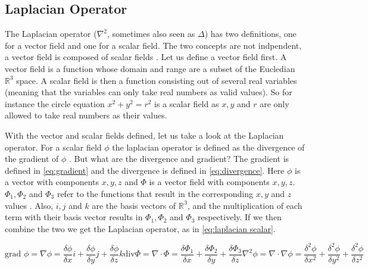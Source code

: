 \subsection{Laplacian Operator} \label{sec:laplace}
The Laplacian operator ($\nabla^2$, sometimes also seen as $\Delta$) has two definitions, one for a vector field and one for a scalar field. The two concepts are not indpendent, a vector field 
is composed of scalar fields \cite{vectorscalarfields}. Let us define a vector field first. A vector field is a function whose domain and range are a subset of the Eucledian $\mathbb{R}^3$ space. 
A scalar field is then a function consisting out of several real variables (meaning that the variables can only take real numbers as valid values). So for instance the circle equation 
$x^2 + y^2 = r^2$ is a scalar field as $x, y$ and $r$ are only allowed to take real numbers as their values. 

With the vector and scalar fields defined, let us take a look at the Laplacian operator. For a scalar field $\phi$ the laplacian operator is defined as the divergence of the gradient of $\phi$
\cite{laplacian}. But what are the divergence and gradient? The gradient is defined in \autoref{eq:gradient} and the divergence is defined in \autoref{eq:divergence}. Here $\phi$ is a vector 
with components $x, y, z$ and $\Phi$ is a vector field with components $x, y, z$. $\Phi_1, \Phi_2$ and $\Phi_3$ refer to the functions that result in the corresponding $x, y$ and $z$ values 
\cite{vectorscalarfields}. Also, $i, j$ and $k$ are the basis vectors of $\mathbb{R^3}$, and the multiplication of each term with their basis vector results in $\Phi_1, \Phi_2$ and $\Phi_3$
respectively. If we then combine the two we get the Laplacian operator, as in \autoref{eq:laplacian scalar}.

\begin{subequations}
    \begin{equation}
        \label{eq:gradient}
        \text{grad } \phi = \nabla \phi = \frac{\delta \phi}{\delta x}i + \frac{\delta \phi}{\delta y}j + \frac{\delta \phi}{\delta z}k      
    \end{equation}
    \begin{equation}
        \label{eq:divergence}
        \text{div} \Phi = \nabla \cdot \Phi = \frac{\delta \Phi_1}{\delta x} + \frac{\delta \Phi_2}{\delta y} + \frac{\delta \Phi_3}{\delta z} 
    \end{equation}
    \begin{equation}
        \label{eq:laplacian scalar}
        \nabla^2 \phi = \nabla \cdot \nabla \phi = \frac{\delta^2 \phi}{\delta x^2} + \frac{\delta^2 \phi}{\delta y^2} + \frac{\delta^2 \phi}{\delta z^2}
    \end{equation}
\end{subequations}

